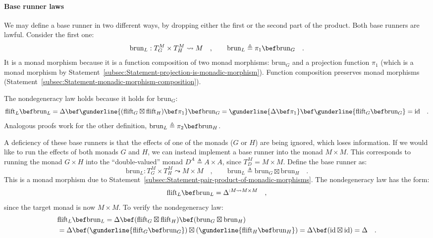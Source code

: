 \paragraph{Base runner laws}

We may define a base runner in two different ways, by dropping either
the first or the second part of the product. Both base runners are
lawful. Consider the first one:
\[
\text{brun}_{L}:T_{G}^{M}\times T_{H}^{M}\leadsto M\quad,\quad\quad\text{brun}_{L}\triangleq\pi_{1}\bef\text{brun}_{G}\quad.
\]
It is a monad morphism because it is a function composition of two
monad morphisms: $\text{brun}_{G}$ and a projection function $\pi_{1}$
(which is a monad morphism by Statement~\ref{subsec:Statement-projection-is-monadic-morphism}).
Function composition preserves monad morphisms (Statement~\ref{subsec:Statement-monadic-morphism-composition}).

The nondegeneracy law holds because it holds for $\text{brun}_{G}$:
\[
\text{flift}_{L}\bef\text{brun}_{L}=\Delta\bef\gunderline{(\text{flift}_{G}\boxtimes\text{flift}_{H})\bef\pi_{1}}\bef\text{brun}_{G}=\gunderline{\Delta\bef\pi_{1}}\bef\gunderline{\text{flift}_{G}\bef\text{brun}_{G}}=\text{id}\quad.
\]
Analogous proofs work for the other definition, $\text{brun}_{L}\triangleq\pi_{2}\bef\text{brun}_{H}$.

A deficiency of these base runners is that the effects of one of the
monads ($G$ or $H$) are being ignored, which loses information.
If we would like to run the effects of both monads $G$ and $H$,
we can instead implement a base runner into the monad $M\times M$.
This corresponds to running the monad $G\times H$ into the \textsf{``}double-valued\textsf{''}
monad $D^{A}\triangleq A\times A$, since $T_{D}^{M}=M\times M$.
Define the base runner as:
\[
\text{brun}_{L}:T_{G}^{M}\times T_{H}^{M}\leadsto M\times M\quad,\quad\quad\text{brun}_{L}\triangleq\text{brun}_{G}\boxtimes\text{brun}_{H}\quad.
\]
This is a monad morphism due to Statement~\ref{subsec:Statement-pair-product-of-monadic-morphisms}.
The nondegeneracy law has the form:
\[
\text{flift}_{L}\bef\text{brun}_{L}=\Delta^{:M\leadsto M\times M}\quad,
\]
since the target monad is now $M\times M$. To verify the nondegeneracy
law:
\begin{align*}
 & \text{flift}_{L}\bef\text{brun}_{L}=\Delta\bef(\text{flift}_{G}\boxtimes\text{flift}_{H})\bef(\text{brun}_{G}\boxtimes\text{brun}_{H})\\
 & =\Delta\bef(\gunderline{\text{flift}_{G}\bef\text{brun}_{G}})\boxtimes(\gunderline{\text{flift}_{H}\bef\text{brun}_{H}})=\Delta\bef(\text{id}\boxtimes\text{id})=\Delta\quad.
\end{align*}


